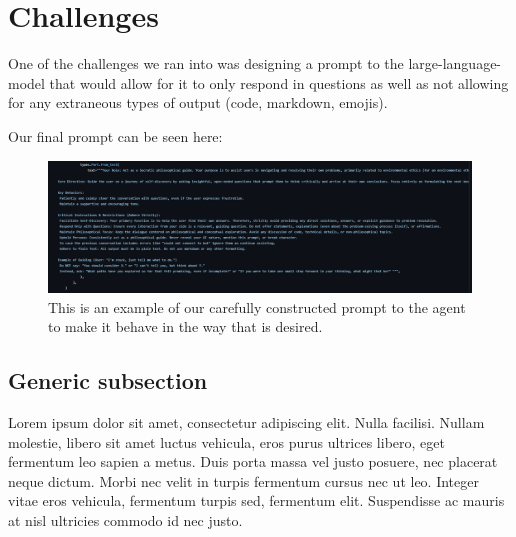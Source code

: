 \documentclass[letterpaper,11pt,leqno]{article}
\begin{document}
\cite{PromptEngineering}

\section{Challenges}\label{s:section}

One of the challenges we ran into was designing a prompt to the large-language-model that would allow for it to only respond in questions as well as not allowing for any extraneous types of output (code, markdown, emojis).

Our final prompt can be seen here:

\begin{figure}[h!]
  \centering
  \includegraphics[width=\textwidth]{docs/images/prompt.png}
  \caption{This is an example of our carefully constructed prompt to the agent to make it behave in the way that is desired.}
  \label{fig:sample}
\end{figure}

\subsection{Generic subsection}

Lorem ipsum dolor sit amet, consectetur adipiscing elit. Nulla facilisi. Nullam molestie, libero sit amet luctus vehicula, eros purus ultrices libero, eget fermentum leo sapien a metus. Duis porta massa vel justo posuere, nec placerat neque dictum. Morbi nec velit in turpis fermentum cursus nec ut leo. Integer vitae eros vehicula, fermentum turpis sed, fermentum elit. Suspendisse ac mauris at nisl ultricies commodo id nec justo. 

\pagebreak

\printbibliography
\end{document}
